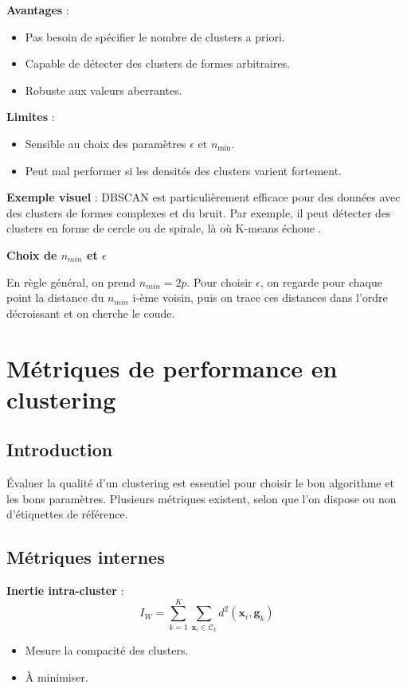 \documentclass[10pt,a4paper]{article}
\begin{document}
\textbf{Avantages} :
\begin{itemize}
    \item Pas besoin de spécifier le nombre de clusters a priori.
    \item Capable de détecter des clusters de formes arbitraires.
    \item Robuste aux valeurs aberrantes.
\end{itemize}

\textbf{Limites} :
\begin{itemize}
    \item Sensible au choix des paramètres $\epsilon$ et $n_{\text{min}}$.
    \item Peut mal performer si les densités des clusters varient fortement.
\end{itemize}

\textbf{Exemple visuel} :
DBSCAN est particulièrement efficace pour des données avec des clusters de formes complexes et du bruit. Par exemple, il peut détecter des clusters en forme de cercle ou de spirale, là où K-means échoue \cite{dbscan-datacamp, dbscan-kdnuggets}.

\textbf{Choix de $n_{min}$ et $\epsilon$}

En règle général, on prend $n_{min} = 2p$. Pour choisir $\epsilon$, on regarde pour chaque point la distance du $n_{min}$ i-ème voisin, puis on trace ces distances dans l'ordre décroissant et on cherche le coude.

\section*{Métriques de performance en clustering}

\subsection*{Introduction}

Évaluer la qualité d'un clustering est essentiel pour choisir le bon algorithme et les bons paramètres. Plusieurs métriques existent, selon que l'on dispose ou non d'étiquettes de référence.

\subsection*{Métriques internes}

\textbf{Inertie intra-cluster} :
$$I_W = \sum_{k=1}^{K} \sum_{\mathbf{x}_i \in \mathcal{C}_k} d^2(\mathbf{x}_i, \mathbf{g}_k)$$
\begin{itemize}
    \item Mesure la compacité des clusters.
    \item À minimiser.
\end{itemize}
\end{document}

